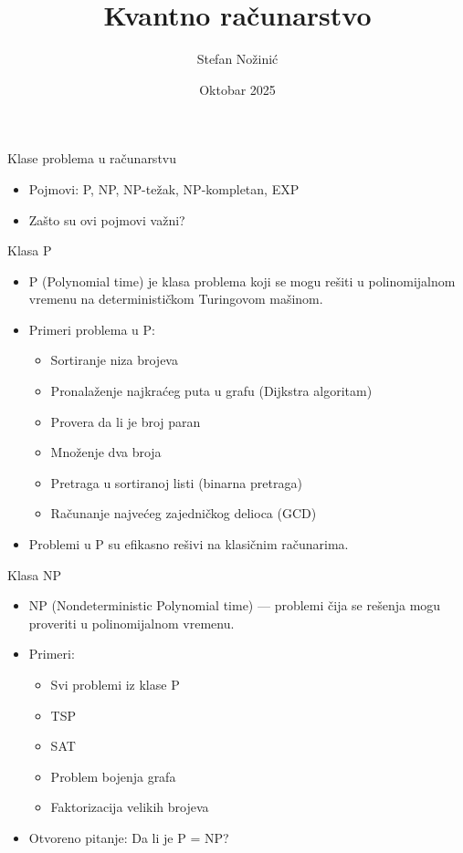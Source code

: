 \documentclass[aspectratio=169]{beamer}
\title{Kvantno računarstvo}
\author{Stefan Nožinić}
\date{Oktobar 2025}
\begin{document}
\maketitle

\begin{frame}{Klase problema u računarstvu}
\begin{itemize}
    \item Pojmovi: P, NP, NP-težak, NP-kompletan, EXP
    \item Zašto su ovi pojmovi važni?
\end{itemize}
\end{frame}

\begin{frame}{Klasa P}
\begin{itemize}
    \item P (Polynomial time) je klasa problema koji se mogu rešiti u polinomijalnom vremenu na determinističkom Turingovom mašinom.
    \item Primeri problema u P:
    \begin{itemize}
        \item Sortiranje niza brojeva
        \item Pronalaženje najkraćeg puta u grafu (Dijkstra algoritam)
        \item Provera da li je broj paran
        \item Množenje dva broja
        \item Pretraga u sortiranoj listi (binarna pretraga)
        \item Računanje najvećeg zajedničkog delioca (GCD)
    \end{itemize}
    \item Problemi u P su efikasno rešivi na klasičnim računarima.
\end{itemize}
\end{frame}

\begin{frame}{Klasa NP}
\begin{itemize}
    \item NP (Nondeterministic Polynomial time) — problemi čija se rešenja mogu proveriti u polinomijalnom vremenu.
    \item Primeri:
    \begin{itemize}
        \item Svi problemi iz klase P
        \item TSP
        \item SAT
        \item Problem bojenja grafa
        \item Faktorizacija velikih brojeva
    \end{itemize}
    \item Otvoreno pitanje: Da li je P = NP?
\end{itemize}
\end{frame}
\end{document}
